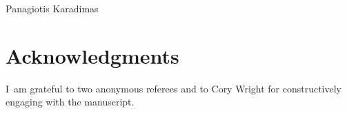 \begin{artengenv}{Panagiotis Karadimas}
\section{Acknowledgments }
I~am grateful to two anonymous referees and to Cory Wright for constructively engaging with the manuscript.

\end{artengenv}
